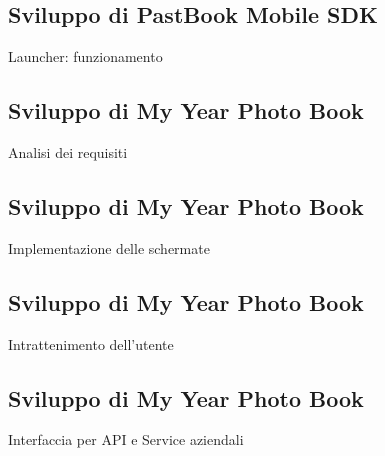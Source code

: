 	\subsection{Sviluppo di PastBook Mobile SDK}
		\begin{frame}{Launcher: funzionamento}
			
		\end{frame}
	\subsection{Sviluppo di My Year Photo Book}
		\begin{frame}{Analisi dei requisiti}
		\end{frame}
	\subsection{Sviluppo di My Year Photo Book}
		\begin{frame}{Implementazione delle schermate}
		\end{frame}
	\subsection{Sviluppo di My Year Photo Book}
		\begin{frame}{Intrattenimento dell'utente}
		\end{frame}
	\subsection{Sviluppo di My Year Photo Book}
		\begin{frame}{Interfaccia per API e Service aziendali}
		\end{frame}
